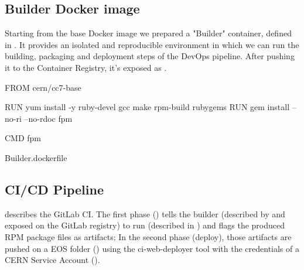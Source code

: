 \subsection{Builder Docker image}

Starting from the  base Docker image we prepared a "Builder" container, defined in . It provides an isolated and reproducible environment in which we can run the building, packaging and deployment steps of the DevOps pipeline.
After pushing it to the Container Registry, it's exposed as .

\begin{listing}[ht]
\begin{yamlcode}
FROM cern/cc7-base

RUN yum install -y ruby-devel gcc make rpm-build rubygems
RUN gem install --no-ri --no-rdoc fpm

CMD fpm
\end{yamlcode}
\caption{Builder.dockerfile}
\end{listing}


\subsection{CI/CD Pipeline}

 describes the GitLab CI. The first phase () tells the builder (described by  and exposed on the GitLab registry) to run  (described in ) and flags the produced RPM package files as artifacts; In the second phase (deploy), those artifacts are pushed on a EOS folder () using the ci-web-deployer tool with the credentials of a CERN Service Account ().


